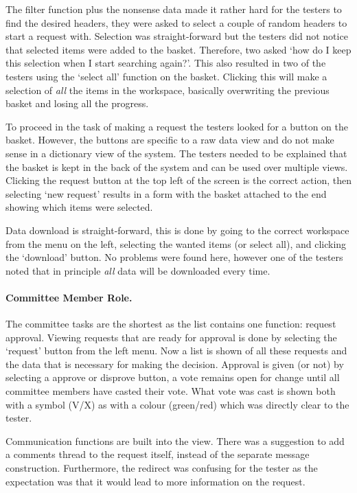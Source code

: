 The filter function plus the nonsense data made it rather hard for the testers to find the desired headers, they were asked to select a couple of random headers to start a request with.
Selection was straight-forward but the testers did not notice that selected items were added to the basket.
Therefore, two asked `how do I keep this selection when I start searching again?'.
This also resulted in two of the testers using the `select all' function on the basket. 
Clicking this will make a selection of \emph{all} the items in the workspace, basically overwriting the previous basket and losing all the progress.

To proceed in the task of making a request the testers looked for a button on the basket.
However, the buttons are specific to a raw data view and do not make sense in a dictionary view of the system.
The testers needed to be explained that the basket is kept in the back of the system and can be used over multiple views.
Clicking the request button at the top left of the screen is the correct action, then selecting `new request' results in a form with the basket attached to the end showing which items were selected.

Data download is straight-forward, this is done by going to the correct workspace from the menu on the left, selecting the wanted items (or select all), and clicking the `download' button.
No problems were found here, however one of the testers noted that in principle \emph{all} data will be downloaded every time.

\paragraph{Committee Member Role.}
The committee tasks are the shortest as the list contains one function: request approval. 
Viewing requests that are ready for approval is done by selecting the `request' button from the left menu.
Now a list is shown of all these requests and the data that is necessary for making the decision.
Approval is given (or not) by selecting a approve or disprove button, a vote remains open for change until all committee members have casted their vote.
What vote was cast is shown both with a symbol (V/X) as with a colour (green/red) which was directly clear to the tester.

Communication functions are built into the view.  
There was a suggestion to add a comments thread to the request itself, instead of the separate message construction.
Furthermore, the redirect was confusing for the tester as the expectation was that it would lead to more information on the request.

